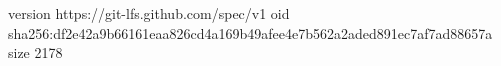 version https://git-lfs.github.com/spec/v1
oid sha256:df2e42a9b66161eaa826cd4a169b49afee4e7b562a2aded891ec7af7ad88657a
size 2178
